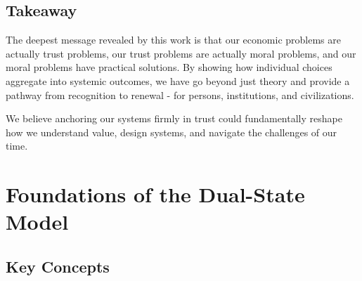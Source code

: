 \documentclass[11pt,oneside]{book}
\begin{document}
\section{Takeaway}

The deepest message revealed by this work is that our economic problems are actually trust problems, our trust problems are actually moral problems, and our moral problems have practical solutions. By showing how individual choices aggregate into systemic outcomes, we have go beyond just theory and provide a pathway from recognition to renewal - for persons, institutions, and civilizations.

We believe anchoring our systems firmly in trust could fundamentally reshape how we understand value, design systems, and navigate the challenges of our time.



\chapter{ Foundations of the Dual-State Model}

\section{Key Concepts}
\end{document}
